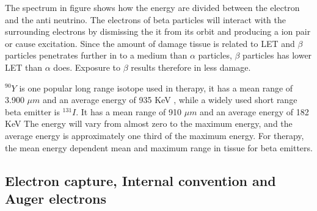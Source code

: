 \documentclass[twoside,english]{uiofysmaster/uiofysmaster}
\begin{document}
The spectrum in figure %
shows how the energy are divided between the electron and the anti neutrino. The electrons of beta particles will interact with the surrounding electrons by dismissing the it from its orbit and producing a ion pair or cause excitation. Since the amount of damage tissue is related to LET and $\beta$ particles penetrates further in to a medium than $\alpha$ particles, $\beta$ particles has lower LET than $\alpha$ does. Exposure to $\beta$ results therefore in less damage.

$^{90}Y$ is one popular long range isotope used in therapy, it has a mean range of 3.900 $\mu m$ and an average energy of 935 KeV%
, while a widely used short range beta emitter is $^{131}I$. It has a mean range of 910 $\mu m$ and an average energy of 182 KeV%
 The energy will vary from almost zero to the maximum energy, and the average energy is approximately one third of the maximum energy. For therapy, the mean energy dependent mean and maximum range in tissue for beta emitters. 



\subsection{Electron capture, Internal convention and Auger electrons}
\end{document}
